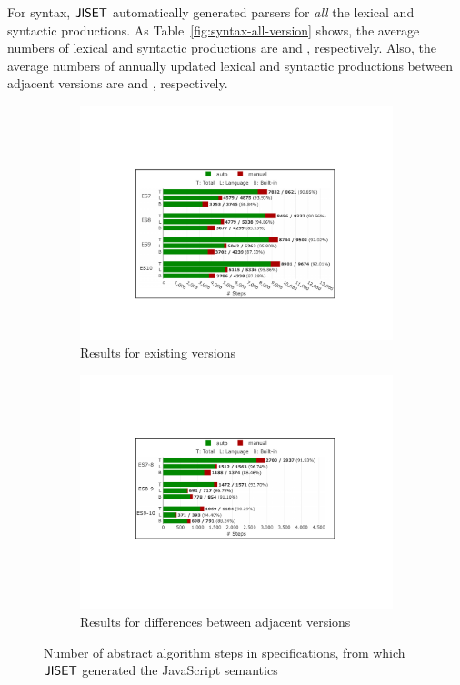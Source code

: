 For syntax, \( \text{\sf JISET} \) automatically generated parsers for \textit{all} the
lexical and syntactic productions.  As Table~\ref{fig:syntax-all-version} shows,
the average numbers of lexical and syntactic productions are  and
, respectively.  Also, the average numbers of annually updated
lexical and syntactic productions between adjacent versions are  and
, respectively.

\begin{figure}[t]
  \centering
  \begin{subfigure}{0.48\textwidth}
    \includegraphics[width=\textwidth]{img/sem-all.pdf}
    \caption{Results for existing versions}
    \label{fig:semantics-all-version}
  \end{subfigure}
  \hfill
  \begin{subfigure}{0.48\textwidth}
    \includegraphics[width=\textwidth]{img/sem-diff.pdf}
    \caption{Results for differences between adjacent versions}
    \label{fig:semantics-all-version-diff}
  \end{subfigure}
  \caption{Number of abstract algorithm steps in specifications, from which
\( \text{\sf JISET} \) generated the JavaScript semantics}
  \label{fig:all-version}
\vspace*{-1em}
\end{figure}

